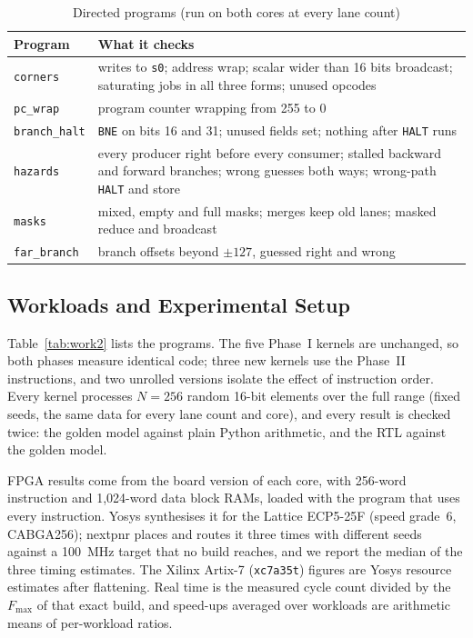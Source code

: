 \begin{table}[t]
\centering
\caption{Directed programs (run on both cores at every lane count)}
\label{tab:directed}
\footnotesize
\begin{tabular}{@{}lL{6.2cm}@{}}
\toprule
Program & What it checks \\
\midrule
\texttt{corners} & writes to \texttt{s0}; address wrap; scalar wider than 16 bits broadcast; saturating jobs in all three forms; unused opcodes \\
\texttt{pc\_wrap} & program counter wrapping from 255 to 0 \\
\texttt{branch\_halt} & \texttt{BNE} on bits 16 and 31; unused fields set; nothing after \texttt{HALT} runs \\
\texttt{hazards} & every producer right before every consumer; stalled backward and forward branches; wrong guesses both ways; wrong-path \texttt{HALT} and store \\
\texttt{masks} & mixed, empty and full masks; merges keep old lanes; masked reduce and broadcast \\
\texttt{far\_branch} & branch offsets beyond $\pm127$, guessed right and wrong \\
\bottomrule
\end{tabular}
\end{table}

\subsection{Workloads and Experimental Setup}\label{sec:setup}
Table~\ref{tab:work2} lists the programs. The five Phase~I kernels are unchanged, so both
phases measure identical code; three new kernels use the Phase~II instructions, and two
unrolled versions isolate the effect of instruction order. Every kernel processes
$N = 256$ random 16-bit elements over the full range (fixed seeds, the same data for every
lane count and core), and every result is checked twice: the golden model against plain
Python arithmetic, and the RTL against the golden model.

FPGA results come from the board version of each core, with 256-word instruction and
1,024-word data block RAMs, loaded with the program that uses every instruction. Yosys
synthesises it for the Lattice ECP5-25F (speed grade~6, CABGA256); nextpnr places and
routes it three times with different seeds against a 100~MHz target that no build
reaches, and we report the median of the three timing estimates. The Xilinx Artix-7
(\texttt{xc7a35t}) figures are Yosys resource estimates after flattening. Real time is the
measured cycle count divided by the $F_{\max}$ of that exact build, and speed-ups averaged
over workloads are arithmetic means of per-workload ratios.

